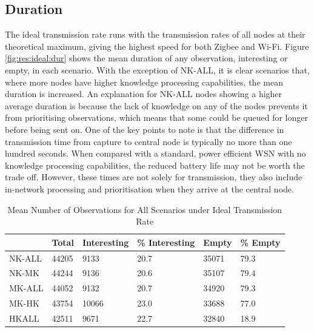 \subsection{Duration}
The ideal transmission rate runs with the transmission rates of all nodes at their theoretical maximum, giving the highest speed for both Zigbee and Wi-Fi. Figure \ref{fig:res:ideal:dur} shows the mean duration of any observation, interesting or empty, in each scenario. With the exception of NK-ALL, it is clear scenarios that, where more nodes have higher knowledge processing capabilities, the mean duration is increased. An explanation for NK-ALL nodes showing a higher average duration is because the lack of knowledge on any of the nodes prevents it from prioritising observations, which means that some could be queued for longer before being sent on. One of the key points to note is that the difference in transmission time from capture to central node is typically no more than one hundred seconds. When compared with a standard, power efficient WSN with no knowledge processing capabilities, the reduced battery life may not be worth the trade off. However, these times are not solely for transmission, they also include in-network processing and prioritisation when they arrive at the central node. 

\begin{table}[h]
\centering
\begin{tabular}{|l|l|l|l|l|l|}
\hline 
      & Total & Interesting & \% Interesting & Empty & \% Empty \\
\hline
NK-ALL & 44205 & 9133        & 20.7           & 35071 & 79.3     \\
NK-MK  & 44244 & 9136        & 20.6           & 35107 & 79.4     \\
MK-ALL & 44052 & 9132        & 20.7           & 34920 & 79.3     \\
MK-HK  & 43754 & 10066       & 23.0           & 33688 & 77.0     \\
HKALL & 42511 & 9671        & 22.7           & 32840 & 18.9     \\
\hline   
\end{tabular}
\caption{Mean Number of Observations for All Scenarios under Ideal Transmission Rate}
\label{sim:tab:ideal}
\end{table}

